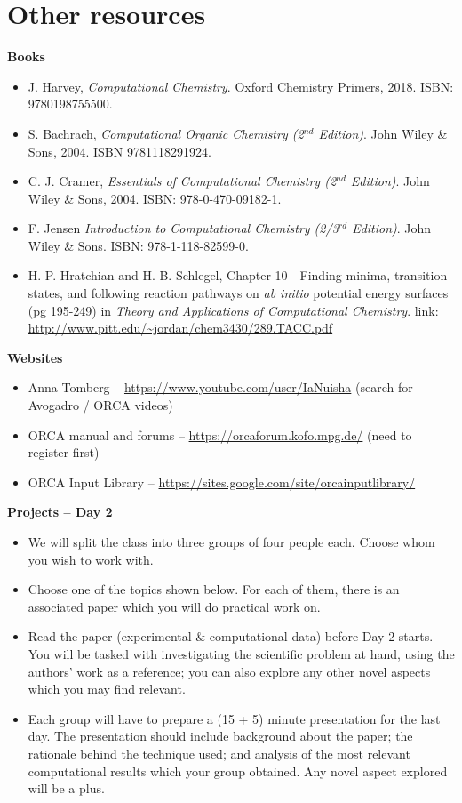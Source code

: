 \documentclass[10pt]{article}
\begin{document}
\section{Other resources}

\textbf{Books}

\begin{itemize}
    \item J. Harvey, {\it Computational Chemistry}. Oxford Chemistry Primers, 2018. ISBN: 9780198755500.
    \item S. Bachrach, {\it Computational Organic Chemistry (2$^{nd}$ Edition)}. John Wiley \& Sons, 2004. ISBN 9781118291924.
    \item C. J. Cramer, {\it Essentials of Computational Chemistry (2$^{nd}$ Edition)}. John Wiley \& Sons, 2004. ISBN: 978-0-470-09182-1.
    \item F. Jensen {\it Introduction to Computational Chemistry (2/3$^{rd}$ Edition)}. John Wiley \& Sons. ISBN: 978-1-118-82599-0.
    \item H. P. Hratchian and H. B. Schlegel, Chapter 10 - Finding minima, transition states, and following reaction pathways on {\it ab initio} potential energy surfaces (pg 195-249) in {\it Theory and Applications of Computational Chemistry}. link: \url{ http://www.pitt.edu/~jordan/chem3430/289.TACC.pdf}
\end{itemize}

\textbf{Websites}

\begin{itemize}
    \item Anna Tomberg -- \url{https://www.youtube.com/user/IaNuisha} (search for Avogadro / ORCA videos) 
    \item ORCA manual and forums -- \url{https://orcaforum.kofo.mpg.de/} (need to register first)
    \item ORCA Input Library -- \url{https://sites.google.com/site/orcainputlibrary/} 
\end{itemize}

\newpage

\textbf{\LARGE Projects -- Day 2}

\begin{itemize}
   \item We will split the class into three groups of four people each. Choose whom you wish to work with.
    \item Choose one of the topics shown below. For each of them, there is an associated paper which you will do practical work on. 
    \item Read the paper (experimental \& computational data) before Day 2 starts. You will be tasked with investigating the scientific problem at hand, using the authors' work as a reference; you can also explore any other novel aspects which you may find relevant.
    \item Each group will have to prepare a (15 + 5) minute presentation for the last day.  The presentation should include background about the paper; the rationale behind the technique used; and analysis of the most relevant computational results which your group obtained. Any novel aspect explored will be a plus.
\end{itemize}
\end{document}
